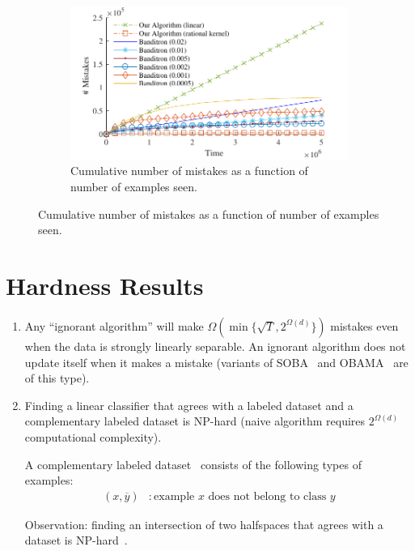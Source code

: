 \documentclass[landscape,a0a,final]{a0poster}
\begin{document}
\begin{multicols}{3}
\begin{figure}[H]
\begin{subfigure}[b]{0.20\textwidth}
  \includegraphics[width=\textwidth]{figures/weak3}
\captionsetup{justification=centering}
\caption{Cumulative number of mistakes as a function of number of examples seen.}
\end{subfigure}
\captionsetup{justification=centering}
\end{figure}

\vspace*{1.5cm}
\section*{Hardness Results}
\begin{enumerate}
      \item Any ``ignorant algorithm'' will make $\Omega(\min\{\sqrt{T}, 2^{\Omega(d)}\})$ mistakes even when the data is strongly linearly separable. An ignorant algorithm does not update itself when it makes a mistake (variants of SOBA~\citep{Beygelzimer-Orabona-Zhang-2017} and OBAMA~\citep{Foster-Kale-Luo-Mohri-Sridharan-2018} are of this type).

    \item Finding a linear classifier that agrees with a labeled dataset and a complementary labeled dataset is NP-hard (naive algorithm requires $2^{\Omega(d)}$ computational complexity).

    A complementary labeled dataset~\citep{ishida2017learning} consists of the following types of examples:
    \begin{align*}
        (x, \overline{y})&: \text{example $x$ does not belong to class $y$}
    \end{align*}

    Observation: finding an intersection of two halfspaces that agrees with a dataset is NP-hard~\citep{Blum-Rivest-1993}.
\end{enumerate}



\end{multicols}
\end{document}
